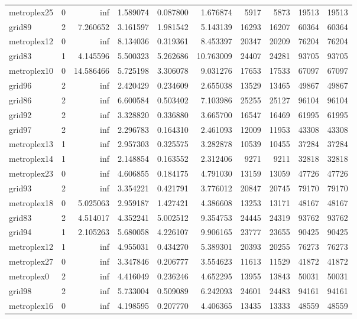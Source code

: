 \begin{longtable}{|l|r|r|r|r|r|r|r|r|r|}
metroplex25 & 0 & inf & 1.589074 & 0.087800 & 1.676874 & 5917 & 5873 & 19513 & 19513 \\
grid89 & 2 & 7.260652 & 3.161597 & 1.981542 & 5.143139 & 16293 & 16207 & 60364 & 60364 \\
metroplex12 & 0 & inf & 8.134036 & 0.319361 & 8.453397 & 20347 & 20209 & 76204 & 76204 \\
grid83 & 1 & 4.145596 & 5.500323 & 5.262686 & 10.763009 & 24407 & 24281 & 93705 & 93705 \\
metroplex10 & 0 & 14.586466 & 5.725198 & 3.306078 & 9.031276 & 17653 & 17533 & 67097 & 67097 \\
grid96 & 2 & inf & 2.420429 & 0.234609 & 2.655038 & 13529 & 13465 & 49867 & 49867 \\
grid86 & 2 & inf & 6.600584 & 0.503402 & 7.103986 & 25255 & 25127 & 96104 & 96104 \\
grid92 & 2 & inf & 3.328820 & 0.336880 & 3.665700 & 16547 & 16469 & 61995 & 61995 \\
grid97 & 2 & inf & 2.296783 & 0.164310 & 2.461093 & 12009 & 11953 & 43308 & 43308 \\
metroplex13 & 1 & inf & 2.957303 & 0.325575 & 3.282878 & 10539 & 10455 & 37284 & 37284 \\
metroplex14 & 1 & inf & 2.148854 & 0.163552 & 2.312406 & 9271 & 9211 & 32818 & 32818 \\
metroplex23 & 0 & inf & 4.606855 & 0.184175 & 4.791030 & 13159 & 13059 & 47726 & 47726 \\
grid93 & 2 & inf & 3.354221 & 0.421791 & 3.776012 & 20847 & 20745 & 79170 & 79170 \\
metroplex18 & 0 & 5.025063 & 2.959187 & 1.427421 & 4.386608 & 13253 & 13171 & 48167 & 48167 \\
grid83 & 2 & 4.514017 & 4.352241 & 5.002512 & 9.354753 & 24445 & 24319 & 93762 & 93762 \\
grid94 & 1 & 2.105263 & 5.680058 & 4.226107 & 9.906165 & 23777 & 23655 & 90425 & 90425 \\
metroplex12 & 1 & inf & 4.955031 & 0.434270 & 5.389301 & 20393 & 20255 & 76273 & 76273 \\
metroplex27 & 0 & inf & 3.347846 & 0.206777 & 3.554623 & 11613 & 11529 & 41872 & 41872 \\
metroplex0 & 2 & inf & 4.416049 & 0.236246 & 4.652295 & 13955 & 13843 & 50031 & 50031 \\
grid98 & 2 & inf & 5.733004 & 0.509089 & 6.242093 & 24601 & 24483 & 94161 & 94161 \\
metroplex16 & 0 & inf & 4.198595 & 0.207770 & 4.406365 & 13435 & 13333 & 48559 & 48559 \\

\end{longtable}
